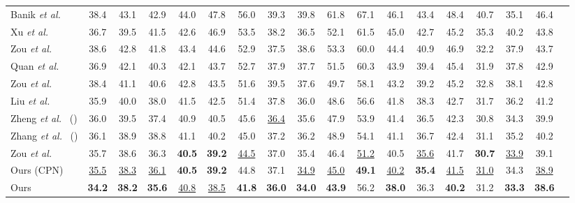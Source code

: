 \documentclass[10pt,journal]{IEEEtran}
\begin{document}
\begin{table*}[!htb]
\begin{tabular}{l*{17}{c}}
Banik \textit{et al.}~\cite{Banik:2021} & 38.4 & 43.1 & 42.9 & 44.0 & 47.8 & 56.0 & 39.3 & 39.8 & 61.8 & 67.1 & 46.1 & 43.4 & 48.4 & 40.7 & 35.1 & 46.4\\
Xu \textit{et al.}~\cite{YuanluXu:2021} & 36.7 & 39.5 & 41.5 & 42.6 & 46.9 & 53.5 & 38.2 & 36.5 & 52.1 & 61.5 & 45.0 & 42.7 & 45.2 & 35.3 & 40.2 & 43.8\\
Zou \textit{et al.}~\cite{zou2020high} &38.6 &42.8& 41.8 &43.4 &44.6& 52.9& 37.5& 38.6 & 53.3 & 60.0 & 44.4 & 40.9 & 46.9 & 32.2 &37.9 & 43.7\\
Quan \textit{et al.}~\cite{quan2021higher} & 36.9 & 42.1&40.3 &42.1 &43.7 &52.7&37.9 &37.7 &51.5 &60.3  &43.9&39.4 & 45.4 & 31.9 & 37.8 & 42.9 \\
Zou \textit{et al.}~\cite{zou2021compositional} & 38.4  & 41.1 &  40.6 &  42.8 &  43.5 &  51.6 &  39.5 &  37.6 &  49.7 &  58.1 &  43.2 &  39.2 &  45.2 &  32.8 &  38.1 &  42.8\\
Liu  \textit{et al.}~\cite{liu2020comprehensive} & 35.9 & 40.0 & 38.0 & 41.5 & 42.5 & 51.4 & 37.8 & 36.0 & 48.6 & 56.6 & 41.8 & 38.3 & 42.7 & 31.7 & 36.2 & 41.2\\
Zheng \textit{et al.}~\cite{PoseFormer:2021} () & 36.0 & 39.5 & 	37.4 & 	40.9 & 	40.5 & 	45.6 & 	\underline{36.4} & 	35.6 & 	47.9 & 	53.9 & 	41.4 & 	 36.5 & 	 42.3 & 	 30.8 & 	34.3 & 	39.9 \\
Zhang \textit{et al.}~\cite{Jinlu2022Mix} () & 36.1	& 38.9 & 38.8 & 41.1 & 	40.2 & 	45.0 & 	37.2 & 	36.2 & 	48.9 & 	54.1 & 	41.1 & 	36.7 & 	42.4 & 	 31.1 & 	 35.2 & 	 40.2 \\
Zou \textit{et al.}~\cite{zou2021modulated} & 35.7 & 38.6 & 36.3 & \textbf{40.5} & \textbf{39.2} & \underline{44.5} & 37.0 & 35.4 & 46.4 &  \underline{51.2} & 40.5 & \underline{35.6} & 41.7 & \textbf{30.7} & \underline{33.9} & 39.1\\
\midrule[.8pt]
Ours (CPN) & \underline{35.5} &	\underline{38.3} &	\underline{36.1} &	\textbf{40.5} &	\textbf{39.2} &	44.8 &	37.1 &	 \underline{34.9} &	\underline{45.0} &	 \textbf{49.1} &	 \underline{40.2} &	\textbf{35.4} &	\underline{41.5} &	\underline{31.0} &	34.3 &	 \underline{38.9} \\
Ours & \textbf{34.2} &	\textbf{38.2} &	\textbf{35.6} &	\underline{40.8} &	\underline{38.5} &	\textbf{41.8} &	\textbf{36.0} &	\textbf{34.0} &	 \textbf{43.9} & 56.2 &	 \textbf{38.0}	& 36.3 & \textbf{40.2} & 31.2 & \textbf{33.3} & \textbf{38.6}  \\
\bottomrule[1pt]
\end{tabular}
\label{Tab:Result2}
\end{table*}
\end{document}
